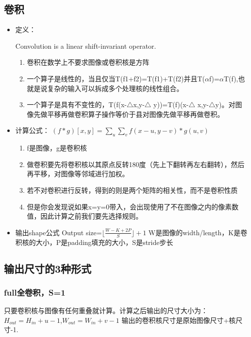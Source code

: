 \documentclass[UTF8]{ctexart}
\begin{document}
\subsection{卷积}
\begin{itemize}
    \item 定义：
    
    Convolution is a linear shift-invariant operator.
    \begin{enumerate}
        \item 卷积在数学上不要求图像或卷积核是方阵
        \item 一个算子是线性的，当且仅当T(f1​+f2​)=T(f1​)+T(f2​)并且T($\alpha$f)=$\alpha$T(f),也就是说复杂的输入可以拆成多个处理核的线性组合。
        \item 一个算子是具有不变性的，T(f(x-$\bigtriangleup $x,y-$\bigtriangleup$ y))=T(f)(x-$\bigtriangleup$ x,y-$\bigtriangleup $y)。对图像先做平移再做卷积算子操作等价于县对图像先做平移再做卷积。
    \end{enumerate}

    \item 计算公式：
    $(f*g)[x,y]=\displaystyle \sum_u \sum_v f(x-u,y-v)*g(u,v)$
    \begin{enumerate}
        \item f是图像，g是卷积核
        \item 做卷积要先将卷积核以其原点反转180度（先上下翻转再左右翻转），然后再平移，对图像等邻域进行加权。
        \item 若不对卷积进行反转，得到的则是两个矩阵的相关性，而不是卷积性质
        \item 但是你会发现说如果x=y=0带入，会出现使用了不在图像之内的像素数值，因此计算之前我们要先选择规则。
    \end{enumerate}

    \item 输出shape公式
    Output size=$\lfloor \frac{W-K+2P}{S} \rfloor+1$
    W是图像的width/length，K是卷积核的大小，P是padding填充的大小，S是stride步长
\end{itemize}

\subsection{输出尺寸的3种形式}
\subsubsection{full全卷积，S=1}
只要卷积核与图像有任何重叠就计算。计算之后输出的尺寸大小为：$H_{out}=H_{in}+u-1$,$W_{out}=W_{in}+v-1$
输出的卷积核尺寸是原始图像尺寸+核尺寸-1.
\end{document}
